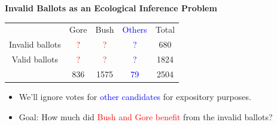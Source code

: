 \documentclass[landscape,letterpaper]{seminar}
\begin{document}
\begin{slide}
  \begin{center}
    \textbf{Invalid Ballots as an Ecological Inference Problem}
  \end{center}

\smallskip
\begin{center}
\small
\begin{table}
    \begin{tabular}{ccccc}
      & Gore  & Bush & \textcolor{Blue}{Others} & Total  \\
      \cline{2-4}
      Invalid ballots &   \textcolor{Red}{?}   &   \textcolor{Red}{?}  &   \textcolor{Blue}{?}    &  680   \\
      Valid ballots   &   \textcolor{Red}{?}   &   \textcolor{Red}{?}  &   \textcolor{Blue}{?}    & 1824   \\
      \cline{2-4}
      & 836   & 1575 &   \textcolor{Blue}{79}   & 2504   \\
    \end{tabular} 
\end{table} 
\end{center}

\begin{itemize}
\item We'll ignore votes for \textcolor{Blue}{other candidates} for expository purposes.
\item Goal: How much did \textcolor{Red}{Bush and Gore benefit} from the invalid ballots?
\end{itemize}

\end{slide}

\end{document}
